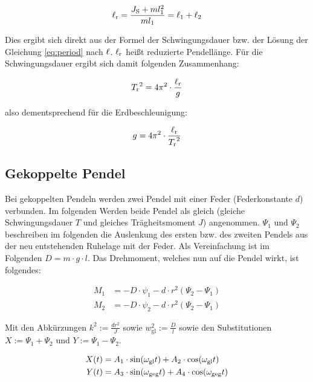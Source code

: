 \begin{equation*}
\ell_{\mathrm{r}} = \frac{J_{\mathrm{S}}+ml^2_1}{ml_1} = \ell_1 + \ell_2
\end{equation*}

Dies ergibt sich direkt aus der Formel der Schwingungsdauer bzw. der Lösung der Gleichung \ref{eq:period} nach $\ell$. $\ell_{\mathrm{r}}$ heißt reduzierte Pendellänge. Für die Schwingungsdauer ergibt sich damit folgenden Zusammenhang:

\begin{equation*}
{T_\mathrm{r}}^2 = 4\pi^2 \cdot \frac{\ell_{\mathrm{r}}}{g}
\end{equation*}

also dementsprechend für die Erdbeschleunigung:

\begin{equation}
g = 4\pi^2 \cdot \frac{\ell_{\mathrm{r}}}{{T_\mathrm{r}}^2}
\label{eq:gravity}
\end{equation}

\subsection{Gekoppelte Pendel}
Bei gekoppelten Pendeln werden zwei Pendel mit einer Feder (Federkonstante $d$) verbunden. Im folgenden Werden beide Pendel als gleich (gleiche Schwingungsdauer $T$ und gleiches Trägheitsmoment $J$) angenommen. $\Psi_1$ und $\Psi_2$ beschreiben im folgenden die Auslenkung des ersten bzw. des zweiten Pendels aus der neu entstehenden Ruhelage mit der Feder. Als Vereinfachung ist im Folgenden $D = m \cdot g \cdot l$. Das Drehmoment, welches nun auf die Pendel wirkt, ist folgendes:

\begin{align}
M_1 &= -D \cdot \psi_1 - d \cdot r^2(\Psi_2 - \Psi_1)   \label{eq:drehmoment1} \\
M_2 &= -D \cdot \psi_2 - d \cdot r^2(\Psi_2 - \Psi_1)   \label{eq:drehmoment2}
\end{align}

Mit den Abkürzungen $k^2 := \frac{dr^2}{J}$ sowie $w_\mathrm{gl}^2 := \frac{D}{l}$ sowie den Substitutionen $X := \Psi_1 + \Psi_2$ und $Y := \Psi_1 - \Psi_2$.

\begin{align}
X(t) &= A_1 \cdot \sin (\omega_{\mathrm{gl}}t) + A_2 \cdot \cos (\omega_{\mathrm{gl}}t)		\label{eq:subst1} \\
Y(t) &= A_3 \cdot \sin (\omega_{\mathrm{geg}}t) + A_4 \cdot \cos (\omega_{\mathrm{geg}}t) 	\label{eq:subst2}
\end{align}

